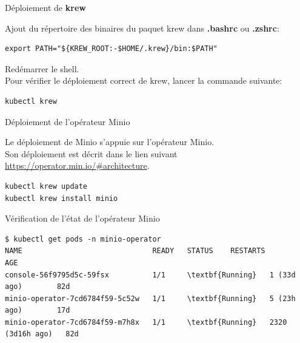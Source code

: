 \begin{frame}[fragile]{Déploiement de \textbf{krew}}

   Ajout du répertoire des binaires du paquet krew dans \textbf{.bashrc} ou \textbf{.zshrc}:

\begin{tiny}
\begin{Verbatim}[commandchars=\&\#\#]
export PATH="${KREW_ROOT:-$HOME/.krew}/bin:$PATH"
\end{Verbatim}
\end{tiny}

Redémarrer le shell.\\
Pour vérifier le déploiement correct de krew, lancer la commande suivante:

\begin{tiny}
\begin{Verbatim}[commandchars=\&\#\#]
kubectl krew
\end{Verbatim}
\end{tiny}

\end{frame}


\begin{frame}[fragile]{Déploiement de l'opérateur Minio}

   Le déploiement de Minio s'appuie sur l'opérateur Minio.\\
   Son déploiement est décrit dans le lien suivant \url{https://operator.min.io/#architecture}.\\

\begin{tiny}
\begin{Verbatim}[commandchars=\&\#\#]
kubectl krew update
kubectl krew install minio
\end{Verbatim}
\end{tiny}


\end{frame}


\begin{frame}[fragile]{Vérification de l'état de l'opérateur Minio}

\begin{tiny}
\begin{Verbatim}[commandchars=\\\{\}]
$ kubectl get pods -n minio-operator
NAME                              READY   STATUS    RESTARTS           AGE
console-56f9795d5c-59fsx          1/1     \textbf{Running}   1 (33d ago)        82d
minio-operator-7cd6784f59-5c52w   1/1     \textbf{Running}   5 (23h ago)        17d
minio-operator-7cd6784f59-m7h8x   1/1     \textbf{Running}   2320 (3d16h ago)   82d
\end{Verbatim}
\end{tiny}

\end{frame}

